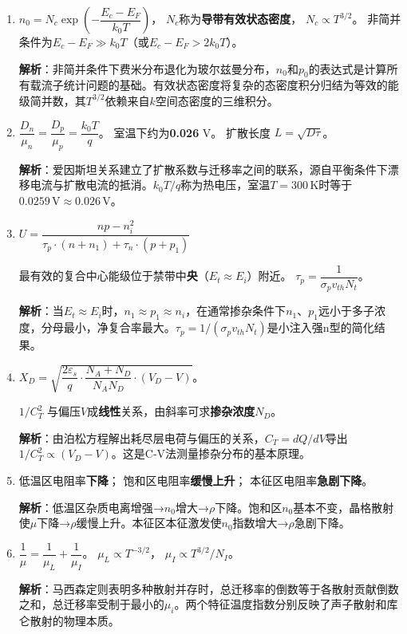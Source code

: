 \documentclass[12pt,a4paper]{ctexart}
\begin{document}
\begin{enumerate}[label=\arabic*.,nosep,leftmargin=2em]

\item
$n_0 = N_c \exp\left(-\dfrac{E_c - E_F}{k_0T}\right)$，
$N_c$称为\textbf{导带有效状态密度}，
$N_c \propto T^{3/2}$。
非简并条件为$E_c - E_F \gg k_0T$（或$E_c - E_F > 2k_0T$）。

\textbf{解析}：非简并条件下费米分布退化为玻尔兹曼分布，$n_0$和$p_0$的表达式是计算所有载流子统计问题的基础。有效状态密度将复杂的态密度积分归结为等效的能级简并数，其$T^{3/2}$依赖来自$k$空间态密度的三维积分。

\item
$\dfrac{D_n}{\mu_n} = \dfrac{D_p}{\mu_p} = \dfrac{k_0T}{q}$。
室温下约为\textbf{0.026} V。
扩散长度 $L = \sqrt{D\tau}$。

\textbf{解析}：爱因斯坦关系建立了扩散系数与迁移率之间的联系，源自平衡条件下漂移电流与扩散电流的抵消。$k_0T/q$称为热电压，室温$T=300\,\text{K}$时等于$0.0259\,\text{V} \approx 0.026\,\text{V}$。

\item
$U = \dfrac{np - n_i^2}{\tau_p \cdot (n + n_1) + \tau_n \cdot (p + p_1)}$

最有效的复合中心能级位于禁带中\textbf{央}（$E_t \approx E_i$）附近。
$\tau_p = \dfrac{1}{\sigma_p v_{th} N_t}$。

\textbf{解析}：当$E_t \approx E_i$时，$n_1 \approx p_1 \approx n_i$，在通常掺杂条件下$n_1$、$p_1$远小于多子浓度，分母最小，净复合率最大。$\tau_p = 1/(\sigma_p v_{th} N_t)$是小注入强n型的简化结果。

\item
$X_D = \sqrt{\dfrac{2\varepsilon_s}{q}\cdot\dfrac{N_A + N_D}{N_A N_D}\cdot(V_D - V)}$。

$1/C_T^2$ 与偏压$V$成\textbf{线性}关系，由斜率可求\textbf{掺杂浓度$N_D$}。

\textbf{解析}：由泊松方程解出耗尽层电荷与偏压的关系，$C_T = dQ/dV$导出$1/C_T^2 \propto (V_D - V)$。这是C-V法测量掺杂分布的基本原理。

\item
低温区电阻率\textbf{下降}；
饱和区电阻率\textbf{缓慢上升}；
本征区电阻率\textbf{急剧下降}。

\textbf{解析}：低温区杂质电离增强→$n_0$增大→$\rho$下降。饱和区$n_0$基本不变，晶格散射使$\mu$下降→$\rho$缓慢上升。本征区本征激发使$n_0$指数增大→$\rho$急剧下降。

\item
$\dfrac{1}{\mu} = \dfrac{1}{\mu_L} + \dfrac{1}{\mu_I}$。
$\mu_L \propto T^{-3/2}$，
$\mu_I \propto T^{3/2}/N_I$。

\textbf{解析}：马西森定则表明多种散射并存时，总迁移率的倒数等于各散射贡献倒数之和，总迁移率受制于最小的$\mu_i$。两个特征温度指数分别反映了声子散射和库仑散射的物理本质。

\end{enumerate}
\end{document}
